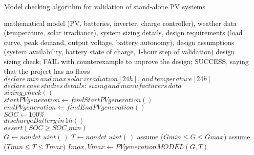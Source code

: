  \begin{algorithm}
 \caption{Model checking algorithm for validation of stand-alone PV systems}
 \begin{algorithmic}[1]
 \begin{scriptsize}
 \renewcommand{\algorithmicrequire}{\textbf{Input:}}
 \renewcommand{\algorithmicensure}{\textbf{Output:}}
 \REQUIRE mathematical model (PV, batteries, inverter, charge controller), weather data (temperature, solar irradiance), system sizing details, design requirements (load curve, peak demand, output voltage, battery autonomy), design assumptions (system availability, battery state of charge, 1-hour step of validation)
 \ENSURE design sizing check; FAIL with counterexample to improve the design; SUCCESS, saying that the project has no flaws
  \STATE $declare \, min \, and \, max \, solar \, irradiation[24h], \, and \, temperature[24h]$\\
  \STATE $declare \, case \, studies \, details: \, sizing \, and \, manufacturers \, data $ \\
  \STATE $sizing \_ check()$ \\
  \STATE $startPVgeneration \leftarrow findStartPVgeneration()$ \\
  \STATE $endPVgeneration \leftarrow findEndPVgeneration()$ \\
  \STATE $SOC \leftarrow 100\%$ \\
	  \STATE $dischargeBattery \, in \, 1h()$ \\
	  \STATE $assert (SOC \geq SOC \_ min)$ \\
  \ENDFOR
    \STATE $G \leftarrow nondet \_ uint(\,)$ 
    \STATE $T \leftarrow nondet \_ uint(\,)$ 
    \STATE assume ($Gmin \leq G \leq Gmax$) 
    \STATE assume ($Tmin \leq T \leq Tmax$) 
    \STATE $Imax, Vmax \leftarrow PVgenerationMODEL (G,T)$ \\

\end{scriptsize}
\end{algorithmic}
\end{algorithm}
